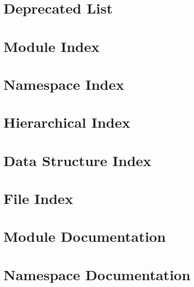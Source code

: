 \documentclass[twoside]{book}
\newcommand{\+}{\discretionary{\mbox{\scriptsize$\hookleftarrow$}}{}{}}
\begin{document}
\chapter{Deprecated List}
\label{deprecated}
\hypertarget{deprecated}{}

\chapter{Module Index}

\chapter{Namespace Index}

\chapter{Hierarchical Index}

\chapter{Data Structure Index}

\chapter{File Index}

\chapter{Module Documentation}











\chapter{Namespace Documentation}


\end{document}
